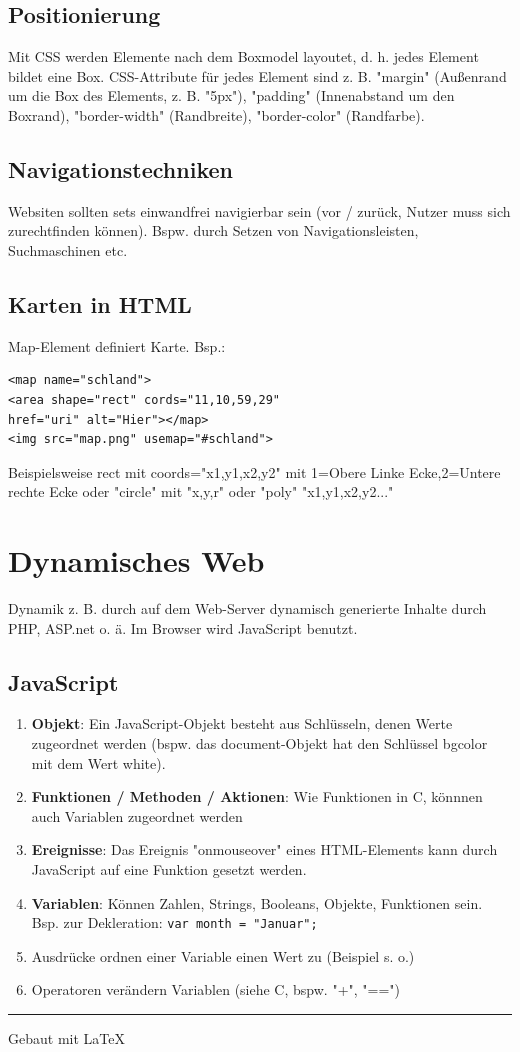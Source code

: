 \documentclass[12pt,landscape]{article}
\begin{document}
\begin{multicols}{3}
\subsection{Positionierung}
Mit CSS werden Elemente nach dem Boxmodel layoutet, d. h. jedes Element bildet eine Box. CSS-Attribute für jedes Element sind z. B. "margin" (Außenrand um die Box des Elements, z. B. "5px"), "padding" (Innenabstand um den Boxrand), "border-width" (Randbreite), "border-color" (Randfarbe).
\subsection{Navigationstechniken}
Websiten sollten sets einwandfrei navigierbar sein (vor / zurück, Nutzer muss sich zurechtfinden können). Bspw. durch Setzen von Navigationsleisten, Suchmaschinen etc.
\subsection{Karten in HTML}
Map-Element definiert Karte. Bsp.:
\begin{lstlisting}
<map name="schland">
<area shape="rect" cords="11,10,59,29"
href="uri" alt="Hier"></map>
<img src="map.png" usemap="#schland">
\end{lstlisting}
Beispielsweise rect mit coords="x1,y1,x2,y2" mit 1=Obere Linke Ecke,2=Untere rechte Ecke oder "circle" mit "x,y,r" oder "poly" "x1,y1,x2,y2..."
\section{Dynamisches Web}
Dynamik z. B. durch auf dem Web-Server dynamisch generierte Inhalte durch PHP, ASP.net o. ä. Im Browser wird JavaScript benutzt.
\subsection{JavaScript}
\begin{enumerate}
\item \textbf{Objekt}: Ein JavaScript-Objekt besteht aus Schlüsseln, denen Werte zugeordnet werden (bspw. das document-Objekt hat den Schlüssel bgcolor mit dem Wert white).
\item \textbf{Funktionen / Methoden / Aktionen}: Wie Funktionen in C, könnnen auch Variablen zugeordnet werden
\item \textbf{Ereignisse}: Das Ereignis "onmouseover" eines HTML-Elements kann durch JavaScript auf eine Funktion gesetzt werden.
\item \textbf{Variablen}: Können Zahlen, Strings, Booleans, Objekte, Funktionen sein. Bsp. zur Dekleration: \lstinline|var month = "Januar";|
\item Ausdrücke ordnen einer Variable einen Wert zu (Beispiel s. o.)
\item Operatoren verändern Variablen (siehe C, bspw. "+", "==")
\end{enumerate}
\rule{0.3\linewidth}{0.25pt}
\scriptsize

Gebaut mit \LaTeX

\end{multicols}
\end{document}

